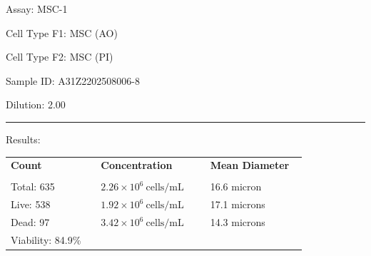 \documentclass[UTF8,10pt,a4paper,fontset=fandol]{ctexart}
\newcommand{\fieldvalue}[1]{#1}
\begin{document}
\newpage

\noindent Assay: 
\fieldvalue{MSC-1}

\medskip
\noindent Cell Type F1: 
\fieldvalue{MSC (AO)}

\noindent Cell Type F2: 
\fieldvalue{MSC (PI)}

\medskip
\noindent Sample ID: 
\fieldvalue{A31Z2202508006-8}

\noindent Dilution: 
\fieldvalue{2.00}

\vspace{0.2em}
\noindent\rule{\linewidth}{0.4pt}

\noindent Results:

\vspace{0.5em}
\begin{tabular}{@{}p{0.28\linewidth}p{0.34\linewidth}p{0.30\linewidth}@{}}
\textbf{Count} & \textbf{Concentration} & \textbf{Mean Diameter} \\
\underline{\hspace{0.22\linewidth}} &
\underline{\hspace{0.25\linewidth}} &
\underline{\hspace{0.23\linewidth}} \\[0.2em]

Total:
\fieldvalue{635}
&
\fieldvalue{$2.26\times10^6\ \mathrm{cells/mL}$}
&
\fieldvalue{16.6 micron}
\\

Live:
\fieldvalue{538}
&
\fieldvalue{$1.92\times10^6\ \mathrm{cells/mL}$}
&
\fieldvalue{17.1 microns}
\\

Dead:
\fieldvalue{97}
&
\fieldvalue{$3.42\times10^6\ \mathrm{cells/mL}$}
&
\fieldvalue{14.3 microns}
\\

Viability:
\fieldvalue{84.9\%}
&
&
\end{tabular}
\end{document}
